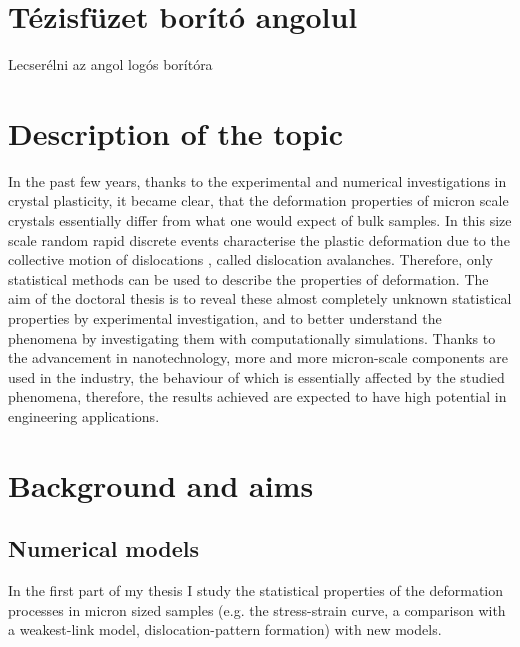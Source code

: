 \documentclass[a5paper,twoside,10pt]{article}
\begin{document}

\section*{Tézisfüzet borító angolul}
Lecserélni az angol logós borítóra
\pagebreak

\section*{Description of the topic}

In the past few years, thanks to the experimental and numerical investigations in crystal plasticity, it became clear, that the deformation properties of micron scale crystals essentially differ from what one would expect of bulk samples. In this size scale random rapid discrete events characterise the plastic deformation due to the collective motion of dislocations \cite{Dimiduk1188}, called dislocation avalanches. Therefore, only statistical methods can be used to describe the properties of deformation. The aim of the doctoral thesis is to reveal these almost completely unknown statistical properties by experimental investigation, and to better understand the phenomena by investigating them with computationally simulations. Thanks to the advancement in nanotechnology, more and more micron-scale components are used in the industry, the behaviour of which is essentially affected by the studied phenomena, therefore, the results achieved are expected to have high potential in engineering applications.

\section*{Background and aims}
\subsection*{Numerical models}

In the first part of my thesis I study the statistical properties of the deformation processes in micron sized samples (e.g. the stress-strain curve, a comparison with a weakest-link model, dislocation-pattern formation) with new models.
\end{document}
